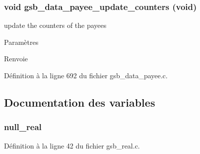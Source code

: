 \subsubsection[{gsb\_\-data\_\-payee\_\-update\_\-counters}]{\setlength{\rightskip}{0pt plus 5cm}void gsb\_\-data\_\-payee\_\-update\_\-counters (void)}\label{gsb__data__payee_8c_a73abbe0b5d9a480fbff94cc2517d5982}
update the counters of the payees


\begin{DoxyParams}{Paramètres}
\item[{\em }]\end{DoxyParams}
\begin{DoxyReturn}{Renvoie}

\end{DoxyReturn}


Définition à la ligne 692 du fichier gsb\_\-data\_\-payee.c.



\subsection{Documentation des variables}
\subsubsection[{null\_\-real}]{ {\bf null\_\-real}}\label{gsb__data__payee_8c_a26f304bec3fdc0651b9aa8765d4de3c6}


Définition à la ligne 42 du fichier gsb\_\-real.c.


